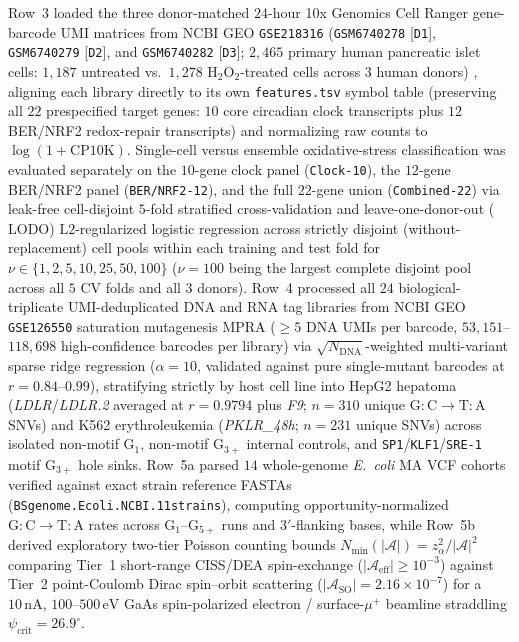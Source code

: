 \documentclass[10pt,letterpaper]{article}
\theoremstyle{plain}
\theoremstyle{definition}
\begin{document}
Row~3 loaded the three donor-matched $24$-hour 10x Genomics Cell Ranger gene-barcode UMI matrices from NCBI GEO \texttt{GSE218316} (\texttt{GSM6740278} [\texttt{D1}], \texttt{GSM6740279} [\texttt{D2}], and \texttt{GSM6740282} [\texttt{D3}]; $2{,}465$ primary human pancreatic islet cells: $1{,}187$ untreated vs.\ $1{,}278$ $\mathrm{H_2O_2}$-treated cells across $3$ human donors) \cite{thomaidou2023diabetologia}, aligning each library directly to its own \texttt{features.tsv} symbol table (preserving all $22$ prespecified target genes: $10$ core circadian clock transcripts plus $12$ BER/NRF2 redox-repair transcripts) and normalizing raw counts to $\log(1 + \mathrm{CP10K})$. Single-cell versus ensemble oxidative-stress classification was evaluated separately on the $10$-gene clock panel (\texttt{Clock-10}), the $12$-gene BER/NRF2 panel (\texttt{BER/NRF2-12}), and the full $22$-gene union (\texttt{Combined-22}) via leak-free cell-disjoint $5$-fold stratified cross-validation and leave-one-donor-out ($\mathrm{LODO}$) $\mathrm{L2}$-regularized logistic regression across strictly disjoint (without-replacement) cell pools within each training and test fold for $\nu \in \{1, 2, 5, 10, 25, 50, 100\}$ ($\nu = 100$ being the largest complete disjoint pool across all $5$ CV folds and all $3$ donors). Row~4 processed all $24$ biological-triplicate UMI-deduplicated DNA and RNA tag libraries from NCBI GEO \texttt{GSE126550} saturation mutagenesis MPRA ($\ge 5$ DNA UMIs per barcode, $53{,}151$--$118{,}698$ high-confidence barcodes per library) \cite{kircher2019natcommun} via $\sqrt{N_{\mathrm{DNA}}}$-weighted multi-variant sparse ridge regression ($\alpha = 10$, validated against pure single-mutant barcodes at $r = 0.84$--$0.99$), stratifying strictly by host cell line into HepG2 hepatoma (\emph{LDLR}/\emph{LDLR.2} averaged at $r = 0.9794$ plus \emph{F9}; $n = 310$ unique $\mathrm{G{:}C \to T{:}A}$ SNVs) and K562 erythroleukemia (\emph{PKLR\_48h}; $n = 231$ unique SNVs) across isolated non-motif $\mathrm{G}_1$, non-motif $\mathrm{G}_{3+}$ internal controls, and \texttt{SP1}/\texttt{KLF1}/\texttt{SRE-1} motif $\mathrm{G}_{3+}$ hole sinks. Row~5a parsed $14$ whole-genome \emph{E.\ coli} MA VCF cohorts \cite{foster2015pnas,garushyants2024gbe} verified against exact strain reference FASTAs (\texttt{BSgenome.Ecoli.NCBI.11strains}), computing opportunity-normalized $\mathrm{G{:}C \to T{:}A}$ rates across $\mathrm{G}_1$--$\mathrm{G}_{5+}$ runs and $3'$-flanking bases, while Row~5b derived exploratory two-tier Poisson counting bounds $N_{\min}(|\mathcal{A}|) = z_\alpha^2 / |\mathcal{A}|^2$ comparing Tier~1 short-range CISS/DEA spin-exchange ($|\mathcal{A}_{\mathrm{eff}}| \ge 10^{-3}$) against Tier~2 point-Coulomb Dirac spin--orbit scattering ($|\mathcal{A}_{\mathrm{SO}}| = 2.16 \times 10^{-7}$) for a $10\,\mathrm{nA}$, $100$--$500\,\mathrm{eV}$ GaAs spin-polarized electron / surface-$\mu^+$ beamline straddling $\psi_{\mathrm{crit}} = 26.9^\circ$.
\end{document}
